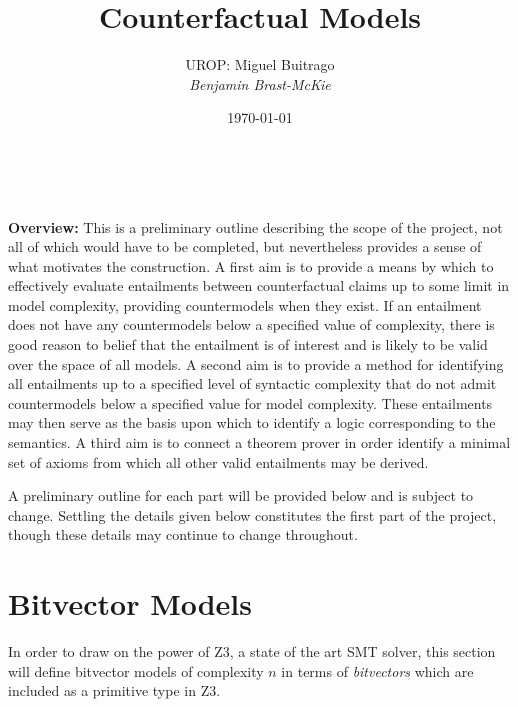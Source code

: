 \documentclass[a4paper, 11pt]{article} %
\title{\textbf{Counterfactual Models}} %
\author{\textsc{UROP:} Miguel Buitrago\\ \em Benjamin Brast-McKie} %
\date{\today} %
\makeatletter
\renewcommand{\maketitle}{ %
\begin{flushright} %
{\LARGE\@title} %

\vspace{10pt} %

{\@author} %
\\\@date %

\vspace{30pt} %
\end{flushright}
}
\makeatother
\begin{document}
\maketitle %

\thispagestyle{empty}



\noindent
\textbf{Overview:} 
This is a preliminary outline describing the scope of the project, not all of which would have to be completed, but nevertheless provides a sense of what motivates the construction.
A first aim is to provide a means by which to effectively evaluate entailments between counterfactual claims up to some limit in model complexity, providing countermodels when they exist.
If an entailment does not have any countermodels below a specified value of complexity, there is good reason to belief that the entailment is of interest and is likely to be valid over the space of all models.
A second aim is to provide a method for identifying all entailments up to a specified level of syntactic complexity that do not admit countermodels below a specified value for model complexity.
These entailments may then serve as the basis upon which to identify a logic corresponding to the semantics.
A third aim is to connect a theorem prover in order identify a minimal set of axioms from which all other valid entailments may be derived.

A preliminary outline for each part will be provided below and is subject to change.
Settling the details given below constitutes the first part of the project, though these details may continue to change throughout.






\section{Bitvector Models}

In order to draw on the power of Z3, a state of the art SMT solver, this section will define bitvector models of complexity $n$ in terms of \textit{bitvectors} which are included as a primitive type in Z3.
\end{document}
